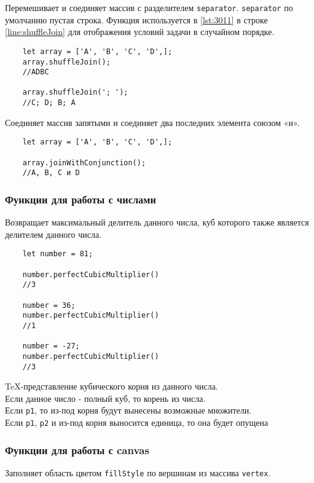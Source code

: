 Перемешивает и соединяет массив с разделителем \texttt{separator}. \texttt{separator} по умолчанию пустая строка. Функция используется в \ref{lst:3011}
в строке \ref{line:shuffleJoin} для отображения условий задачи в случайном порядке.

\begin{lstlisting}
    let array = ['A', 'B', 'C', 'D',];
    array.shuffleJoin();
    //ADBC

    array.shuffleJoin('; ');
    //C; D; B; A 
\end{lstlisting}

Соединяет массив запятыми и соединяет два последних элемента союзом «и».

\begin{lstlisting}
    let array = ['A', 'B', 'C', 'D',];

    array.joinWithConjunction();
    //A, B, C и D
\end{lstlisting}

\subsubsection{Функции для работы с числами}
Возвращает максимальный делитель данного числа, куб которого также является делителем данного числа.

\begin{lstlisting}
    let number = 81;

    number.perfectCubicMultiplier()
    //3

    number = 36;
    number.perfectCubicMultiplier()
    //1

    number = -27;
    number.perfectCubicMultiplier()
    //3
\end{lstlisting}

TeX-представление кубического корня из данного числа.\\
Если данное число - полный куб, то корень из числа.\\
Если \texttt{p1}, то из-под корня будут вынесены возможные множители.\\
Если \texttt{p1}, \texttt{p2} и из-под корня выносится единица, то она будет опущена\\

\subsubsection{Функции для работы с canvas}
Заполняет область цветом \texttt{fillStyle} по вершинам из массива \texttt{vertex}.

